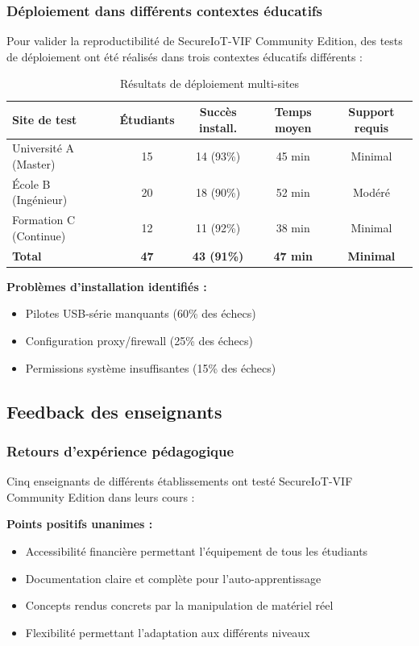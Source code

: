 \subsubsection{Déploiement dans différents contextes éducatifs}

Pour valider la reproductibilité de SecureIoT-VIF Community Edition, des tests de déploiement ont été réalisés dans trois contextes éducatifs différents :

\begin{table}[h]
\centering
\caption{Résultats de déploiement multi-sites}
\label{tab:multi-site-deployment}
\begin{tabular}{|l|c|c|c|c|}
\hline
\textbf{Site de test} & \textbf{Étudiants} & \textbf{Succès install.} & \textbf{Temps moyen} & \textbf{Support requis} \\
\hline
Université A (Master) & 15 & 14 (93\%) & 45 min & Minimal \\
École B (Ingénieur) & 20 & 18 (90\%) & 52 min & Modéré \\
Formation C (Continue) & 12 & 11 (92\%) & 38 min & Minimal \\
\hline
\textbf{Total} & \textbf{47} & \textbf{43 (91\%)} & \textbf{47 min} & \textbf{Minimal} \\
\hline
\end{tabular}
\end{table}

\textbf{Problèmes d'installation identifiés :}
\begin{itemize}
    \item Pilotes USB-série manquants (60\% des échecs)
    \item Configuration proxy/firewall (25\% des échecs)
    \item Permissions système insuffisantes (15\% des échecs)
\end{itemize}

\subsection{Feedback des enseignants}

\subsubsection{Retours d'expérience pédagogique}

Cinq enseignants de différents établissements ont testé SecureIoT-VIF Community Edition dans leurs cours :

\textbf{Points positifs unanimes :}
\begin{itemize}
    \item Accessibilité financière permettant l'équipement de tous les étudiants
    \item Documentation claire et complète pour l'auto-apprentissage
    \item Concepts rendus concrets par la manipulation de matériel réel
    \item Flexibilité permettant l'adaptation aux différents niveaux
\end{itemize}

